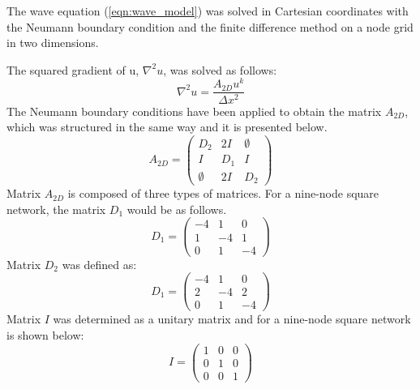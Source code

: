 \documentclass[12pt, a4paper]{article} %
\begin{document}
\normalsize 

\setlength{\parskip}{4mm}

The wave equation (\ref{eqn:wave_model}) was solved in Cartesian coordinates with the Neumann boundary condition and the finite difference method on a node grid in two dimensions. 

\setlength{\parindent}{8pt}

The squared gradient of u, $\nabla^{2}u$, was solved as follows:
\begin{equation} \label{eqn:nabla2u}
 \nabla^{2}u = \frac{A_{2D}u^{k}}{\Delta x^{2}}
\end{equation}
The Neumann boundary conditions have been applied to obtain the matrix $A_{2D}$, which was structured in the same way and it is presented below.
\begin{equation} \label{eqn:matrixA}
    A_{2D} = 
        \begin{pmatrix}
            D_{2} & 2I & \emptyset\\
            I & D_{1} & I\\
            \emptyset & 2I & D_{2}
    \end{pmatrix}
\end{equation}
Matrix $A_{2D}$ is composed of three types of matrices. For a nine-node square network, the matrix $D_{1}$ would be as follows.
\begin{equation} \label{eqn:matrixD1}
    D_{1} = 
        \begin{pmatrix}
            -4 & 1 & 0\\
            1 & -4 & 1\\
            0 & 1 & -4
    \end{pmatrix}
\end{equation}
Matrix $D_{2}$ was defined as:
\begin{equation} \label{eqn:matrixD2}
    D_{1} = 
        \begin{pmatrix}
            -4 & 1 & 0\\
            2 & -4 & 2\\
            0 & 1 & -4
    \end{pmatrix}
\end{equation}
Matrix $I$ was determined as a unitary matrix and for a nine-node square network is shown below:
\begin{equation} \label{eqn:matrixI}
    I = 
        \begin{pmatrix}
            1 & 0 & 0\\
            0 & 1 & 0\\
            0 & 0 & 1
    \end{pmatrix}
\end{equation}
\end{document}
